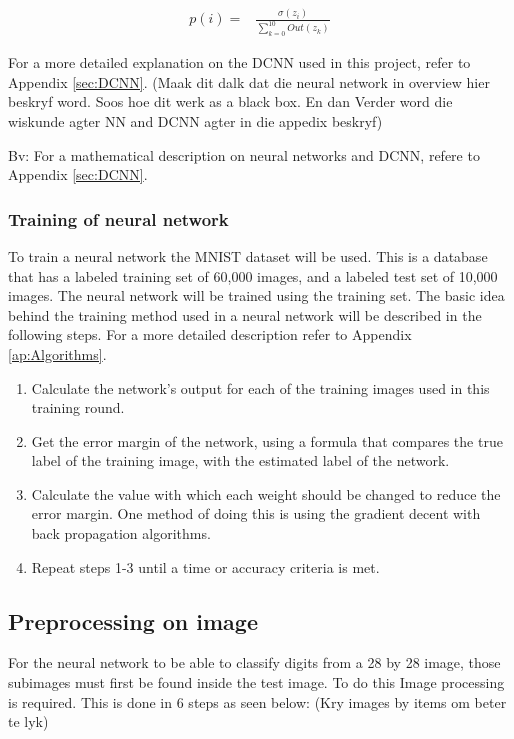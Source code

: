 \begin{align}
  p(i) =  &\displaystyle{\frac{\sigma(z_{i})}{\sum_{k=0}^{10} Out(z_{k})}}
\label{eqn:normal}
\end{align}

For a more detailed explanation on the DCNN used in this project, refer to Appendix \ref{sec:DCNN}. (Maak dit dalk dat die neural network in overview hier beskryf word. Soos hoe dit werk as a black box. En dan Verder word die wiskunde agter NN and DCNN agter in die appedix beskryf)

Bv: For a mathematical description on neural networks and DCNN, refere to Appendix \ref{sec:DCNN}.

\subsubsection{Training of neural network}
\label{sec:trainNN}

To train a neural network the MNIST dataset will be used. This is a database that has a labeled training set of 60,000 images, and a labeled test set of 10,000 images. The neural network will be trained using the training set. The basic idea behind the training method used in a neural network will be described in the following steps. For a more detailed description refer to Appendix \ref{ap:Algorithms}.

\begin{enumerate}
\item Calculate the network's output for each of the training images used in this training round.
\item Get the error margin of the network, using a formula that compares the true label of the training image, with the estimated label of the network.
\item Calculate the value with which each weight should be changed to reduce the error margin. One method of doing this is using the gradient decent with back propagation algorithms.
\item Repeat steps 1-3 until a time or accuracy criteria is met.
\end{enumerate}


\subsection{Preprocessing on image}
\label{sec:preprocess}

For the neural network to be able to classify digits from a 28 by 28 image, those subimages must first be found inside the test image. To do this Image processing is required. This is done in 6 steps as seen below: (Kry images by items om beter te lyk)

